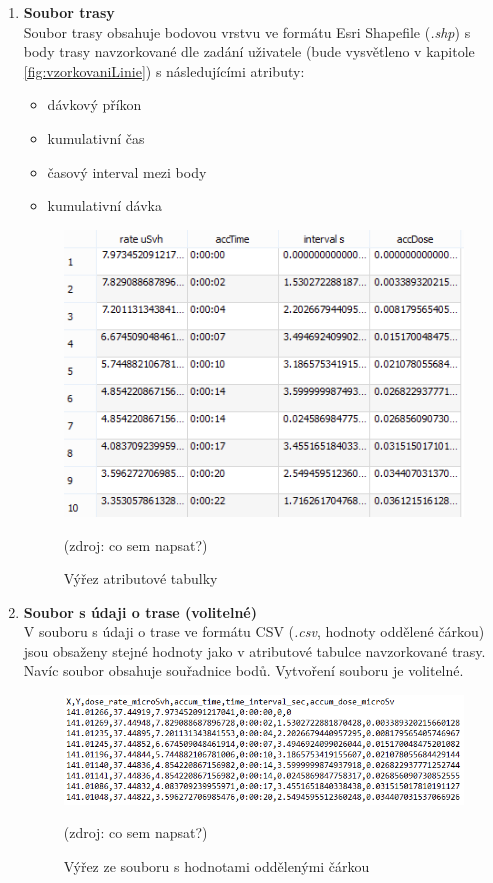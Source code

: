 \begin{enumerate}
	\item \textbf{Soubor trasy} \\
	Soubor trasy obsahuje bodovou vrstvu ve formátu Esri Shapefile (\textit{.shp}) s body trasy navzorkované dle zadání uživatele (bude vysvětleno v kapitole \ref{fig:vzorkovaniLinie}) s následujícími atributy:
		\begin{itemize}
			\item dávkový příkon
			\item kumulativní čas
			\item časový interval mezi body
			\item kumulativní dávka
		\end{itemize}
			\begin{figure}[H]
    			\centering
      			\includegraphics[scale=0.8]{./pictures/atributova_tabulka.png}
      				\caption[Výřez atributové tabulky]{Výřez atributové tabulky}(zdroj: co sem napsat?)
     				\label{fig:atributova_tabulka}
  			\end{figure}
  	
  	\item \textbf{Soubor s údaji o trase (volitelné)} \\
  	V souboru s údaji o trase ve formátu CSV (\textit{.csv}, hodnoty oddělené čárkou) jsou obsaženy stejné hodnoty jako v atributové tabulce navzorkované trasy. Navíc soubor obsahuje souřadnice bodů. Vytvoření souboru je volitelné. 
  			\begin{figure}[H]
    			\centering
      			\includegraphics[scale=0.8]{./pictures/csv.png}
      				\caption[Výřez ze souboru s hodnotami oddělenými čárkou]{Výřez ze souboru s hodnotami oddělenými čárkou}(zdroj: co sem napsat?)
     				\label{fig:csv}
  			\end{figure}	
\end{enumerate}

